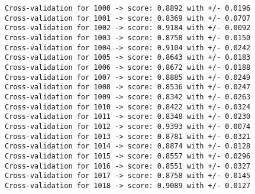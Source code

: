 \documentclass[11pt]{article}
\begin{document}
    \begin{Verbatim}[commandchars=\\\{\}]
Cross-validation for 1000 -> score: 0.8892 with +/- 0.0196
Cross-validation for 1001 -> score: 0.8369 with +/- 0.0707
Cross-validation for 1002 -> score: 0.9184 with +/- 0.0092
Cross-validation for 1003 -> score: 0.8758 with +/- 0.0150
Cross-validation for 1004 -> score: 0.9104 with +/- 0.0242
Cross-validation for 1005 -> score: 0.8643 with +/- 0.0183
Cross-validation for 1006 -> score: 0.8672 with +/- 0.0188
Cross-validation for 1007 -> score: 0.8885 with +/- 0.0249
Cross-validation for 1008 -> score: 0.8536 with +/- 0.0247
Cross-validation for 1009 -> score: 0.8342 with +/- 0.0263
Cross-validation for 1010 -> score: 0.8422 with +/- 0.0324
Cross-validation for 1011 -> score: 0.8348 with +/- 0.0230
Cross-validation for 1012 -> score: 0.9393 with +/- 0.0074
Cross-validation for 1013 -> score: 0.8781 with +/- 0.0321
Cross-validation for 1014 -> score: 0.8874 with +/- 0.0128
Cross-validation for 1015 -> score: 0.8557 with +/- 0.0296
Cross-validation for 1016 -> score: 0.8551 with +/- 0.0327
Cross-validation for 1017 -> score: 0.8758 with +/- 0.0145
Cross-validation for 1018 -> score: 0.9089 with +/- 0.0127

    \end{Verbatim}
\end{document}
